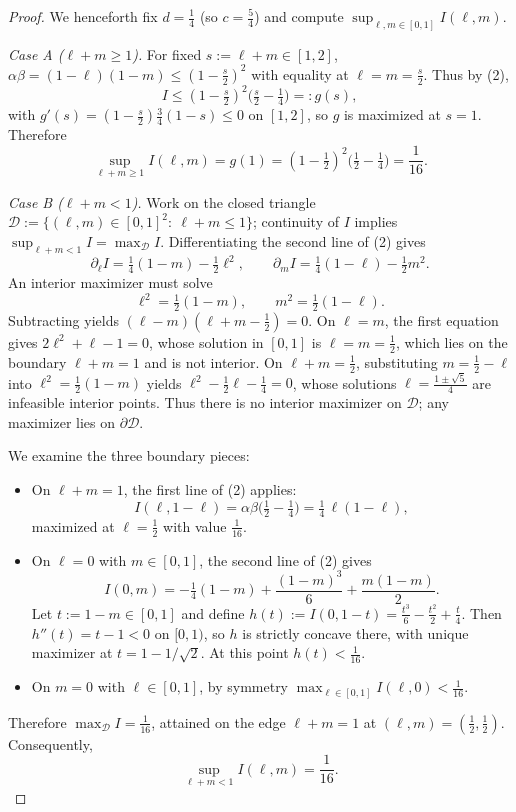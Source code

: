\begin{proof}
We henceforth fix $d=\tfrac14$ (so $c=\tfrac54$) and compute $\sup_{\ell,m\in[0,1]} I(\ell,m)$.

\textit{Case A ($\ell+m\ge1$).} For fixed $s:=\ell+m\in[1,2]$, $\alpha\beta=(1-\ell)(1-m)\le(1-\tfrac{s}{2})^2$ with equality at $\ell=m=\tfrac{s}{2}$. Thus by (2),
\[
I\le (1-\tfrac{s}{2})^2\Big(\tfrac{s}{2}-\tfrac14\Big)=:g(s),
\]
with $g'(s)=(1-\tfrac{s}{2})\tfrac{3}{4}(1-s)\le0$ on $[1,2]$, so $g$ is maximized at $s=1$. Therefore
\[
\sup_{\ell+m\ge1} I(\ell,m)=g(1)=(1-\tfrac12)^2\Big(\tfrac12-\tfrac14\Big)=\frac{1}{16}.\tag{3}
\]

\textit{Case B ($\ell+m<1$).} Work on the closed triangle $\mathcal{D}:=\{(\ell,m)\in[0,1]^2:\ \ell+m\le1\}$; continuity of $I$ implies $\sup_{\ell+m<1}I=\max_{\mathcal{D}}I$. Differentiating the second line of (2) gives
\[
\partial_\ell I=\tfrac14(1-m)-\tfrac12\ell^2,\qquad \partial_m I=\tfrac14(1-\ell)-\tfrac12 m^2.
\]
An interior maximizer must solve
\[
\ell^2=\tfrac12(1-m),\qquad m^2=\tfrac12(1-\ell).
\]
Subtracting yields $(\ell-m)(\ell+m-\tfrac12)=0$. On $\ell=m$, the first equation gives $2\ell^2+\ell-1=0$, whose solution in $[0,1]$ is $\ell=m=\tfrac12$, which lies on the boundary $\ell+m=1$ and is not interior. On $\ell+m=\tfrac12$, substituting $m=\tfrac12-\ell$ into $\ell^2=\tfrac12(1-m)$ yields $\ell^2-\tfrac12\ell-\tfrac14=0$, whose solutions $\ell=\tfrac{1\pm\sqrt5}{4}$ are infeasible interior points. Thus there is no interior maximizer on $\mathcal{D}$; any maximizer lies on $\partial\mathcal{D}$.

We examine the three boundary pieces:
\begin{itemize}
\item On $\ell+m=1$, the first line of (2) applies:
\[
I(\ell,1-\ell)=\alpha\beta\Big(\tfrac{1}{2}-\tfrac14\Big)=\tfrac14\,\ell(1-\ell),
\]
maximized at $\ell=\tfrac12$ with value $\tfrac{1}{16}$.
\item On $\ell=0$ with $m\in[0,1]$, the second line of (2) gives
\[
I(0,m)=-\tfrac14(1-m)+\frac{(1-m)^3}{6}+\frac{m(1-m)}{2}.
\]
Let $t:=1-m\in[0,1]$ and define $h(t):=I(0,1-t)=\tfrac{t^3}{6}-\tfrac{t^2}{2}+\tfrac{t}{4}$. Then $h''(t)=t-1<0$ on $[0,1)$, so $h$ is strictly concave there, with unique maximizer at $t=1-1/\sqrt2$. At this point $h(t)<\tfrac{1}{16}$.
\item On $m=0$ with $\ell\in[0,1]$, by symmetry $\max_{\ell\in[0,1]} I(\ell,0)<\tfrac{1}{16}$.
\end{itemize}
Therefore $\max_{\mathcal{D}} I=\tfrac{1}{16}$, attained on the edge $\ell+m=1$ at $(\ell,m)=(\tfrac12,\tfrac12)$. Consequently,
\[
\sup_{\ell+m<1} I(\ell,m)=\frac{1}{16}.\tag{4}
\]


\end{proof}
